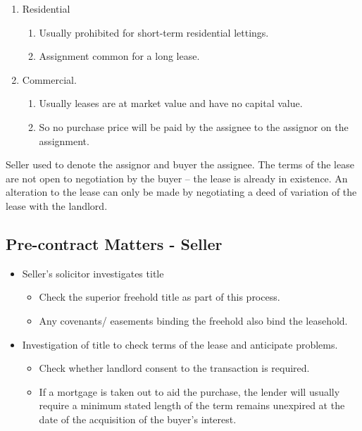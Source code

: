 \documentclass[
]{article}
\providecommand{\tightlist}{%
  \setlength{\itemsep}{0pt}\setlength{\parskip}{0pt}}
\begin{document}
\begin{enumerate}
\def\labelenumi{\arabic{enumi}.}
\tightlist
\item
  Residential

  \begin{enumerate}
  \def\labelenumii{\arabic{enumii}.}
  \tightlist
  \item
    Usually prohibited for short-term residential lettings.
  \item
    Assignment common for a long lease.
  \end{enumerate}
\item
  Commercial.

  \begin{enumerate}
  \def\labelenumii{\arabic{enumii}.}
  \tightlist
  \item
    Usually leases are at market value and have no capital value.
  \item
    So no purchase price will be paid by the assignee to the assignor on
    the assignment.
  \end{enumerate}
\end{enumerate}

Seller used to denote the assignor and buyer the assignee. The terms of
the lease are not open to negotiation by the buyer -- the lease is
already in existence. An alteration to the lease can only be made by
negotiating a deed of variation of the lease with the landlord.

\hypertarget{pre-contract-matters---seller}{%
\subsection{Pre-contract Matters -
Seller}\label{pre-contract-matters---seller}}

\begin{itemize}
\tightlist
\item
  Seller's solicitor investigates title

  \begin{itemize}
  \tightlist
  \item
    Check the superior freehold title as part of this process.
  \item
    Any covenants/ easements binding the freehold also bind the
    leasehold.
  \end{itemize}
\item
  Investigation of title to check terms of the lease and anticipate
  problems.

  \begin{itemize}
  \tightlist
  \item
    Check whether landlord consent to the transaction is required.
  \item
    If a mortgage is taken out to aid the purchase, the lender will
    usually require a minimum stated length of the term remains
    unexpired at the date of the acquisition of the buyer's interest.
  \end{itemize}
\end{itemize}
\end{document}
